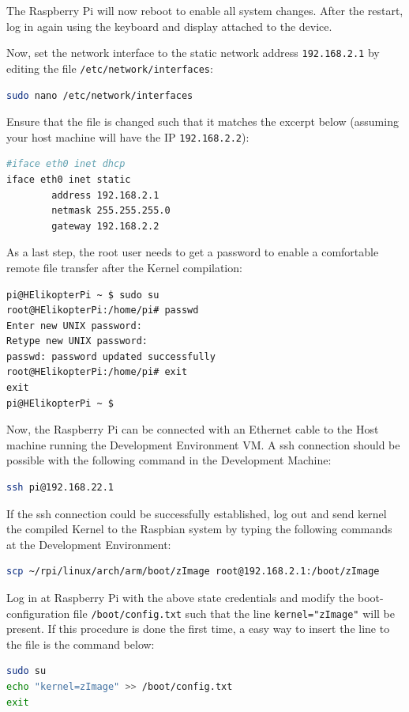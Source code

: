 The Raspberry Pi will now reboot to enable all system changes. After the restart, log in again using the keyboard and display attached to the device.

Now, set the network interface to the static network address \texttt{192.168.2.1} by editing the file \texttt{/etc/network/interfaces}:
\begin{lstlisting}[language=bash,otherkeywords={make,scp,dd,sudo,nano}]
sudo nano /etc/network/interfaces
\end{lstlisting}
Ensure that the file is changed such that it matches the excerpt below (assuming your host machine will have the IP \texttt{192.168.2.2}):
\begin{lstlisting}[language=bash,otherkeywords={make,scp,sudo}]
#iface eth0 inet dhcp
iface eth0 inet static
        address 192.168.2.1
        netmask 255.255.255.0
        gateway 192.168.2.2
\end{lstlisting}

As a last step, the root user needs to get a password to enable a comfortable remote file transfer after the Kernel compilation:
\begin{lstlisting}[otherkeywords={make,scp,dd,sudo,su}]
pi@HElikopterPi ~ $ sudo su
root@HElikopterPi:/home/pi# passwd
Enter new UNIX password: 
Retype new UNIX password: 
passwd: password updated successfully
root@HElikopterPi:/home/pi# exit
exit
pi@HElikopterPi ~ $
\end{lstlisting}

Now, the Raspberry Pi can be connected with an Ethernet cable to the Host machine running the Development Environment VM. A ssh connection should be possible with the following command in the Development Machine:
\begin{lstlisting}[language=bash,otherkeywords={make,scp,dd,sudo}]
ssh pi@192.168.22.1
\end{lstlisting}

If the ssh connection could be successfully established, log out and send kernel the compiled Kernel to the Raspbian system by typing the following commands at the Development Environment:
\begin{lstlisting}[language=bash,otherkeywords={make,scp,dd,sudo}]
scp ~/rpi/linux/arch/arm/boot/zImage root@192.168.2.1:/boot/zImage
\end{lstlisting}

Log in at Raspberry Pi with the above state credentials and modify the boot-configuration file \texttt{/boot/config.txt} such that the line \texttt{kernel="zImage"} will be present. If this procedure is done the first time, a easy way to insert the line to the file is the command below:
\begin{lstlisting}[language=bash,otherkeywords={make,scp,dd,sudo}]
sudo su
echo "kernel=zImage" >> /boot/config.txt
exit
\end{lstlisting}

